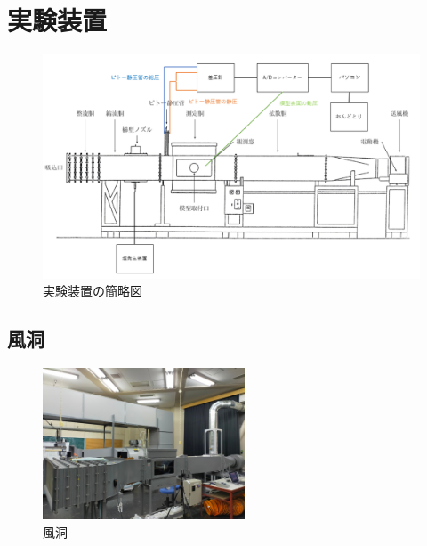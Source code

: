 \documentclass[a4paper,titlepage]{ltjsarticle}
\begin{document}
\section{実験装置}

\begin{figure}[hbtp]
  \centering
  \includegraphics[width=15cm]{風洞.png}
  \caption{実験装置の簡略図}
  \label{簡略図}
\end{figure}

\clearpage

\subsection{風洞}

\begin{figure}[hbtp]
  \centering
  \includegraphics[width=6cm]{風洞全体図.jpg}
  \caption{風洞}
  \label{風洞}
\end{figure}
\end{document}
